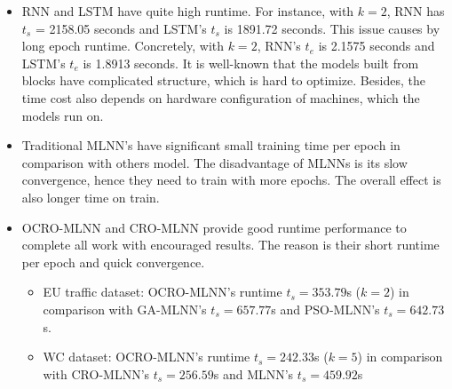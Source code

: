 \documentclass[smallcondensed, natbib]{svjour3}     %
\begin{document}
{\begin{itemize}
\item RNN and LSTM have quite high runtime. For instance, with $k = 2$, RNN has $t_s$ = 2158.05 seconds and LSTM's $t_s$ is 1891.72 seconds. This issue causes by long epoch runtime. Concretely, with $k = 2$, RNN's $t_e$ is 2.1575 seconds and LSTM's $t_e$ is 1.8913 seconds. It is well-known that the models built from blocks have complicated structure, which is hard to optimize. Besides, the time cost also depends on hardware configuration of machines, which the models run on.
\item Traditional MLNN's have significant small training time per epoch in comparison with others model. The disadvantage of MLNNs is its slow convergence, hence they need to train with more epochs. The overall effect is also longer time on train. 
\item OCRO-MLNN and CRO-MLNN provide good runtime performance to complete all work with encouraged results. The reason is their short runtime per epoch and quick convergence.
	\begin{itemize}
		\item EU traffic dataset: OCRO-MLNN's runtime $t_s = 353.79$s ($k = 2$) in comparison with GA-MLNN's $t_s = 657.77$s and PSO-MLNN's $t_s = 642.73$s.
		\item WC dataset: OCRO-MLNN's runtime $t_s = 242.33$s ($k = 5$) in comparison with CRO-MLNN's $t_s = 256.59$s and MLNN's $t_s = 459.92$s
	\end{itemize}

\end{itemize}

}
\end{document}
